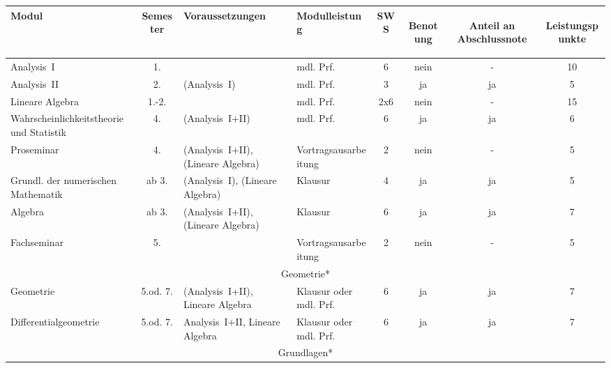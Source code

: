 \begin{table}[tbp]
    \begin{footnotesize}
    \begin{tabularx}{\textwidth}{|@{~}X@{~}|@{~}c@{~}|@{~}X@{~}|@{~}X@{~}|@{~}c@{~}|@{~}c@{~}|@{~}c@{~}|@{~}c@{~}|}
        \hline
        Modul & Semes\-ter & Voraus\-setzungen & Modul\-leistung & SWS & \begin{sideways}Be\-notung\end{sideways} & \begin{sideways}Anteil an Abschluss\-note \end{sideways}& \begin{sideways}Leistungspunkte\end{sideways}\\\hline\hline
        Analysis~I  &   1.  &                &   mdl. Prf.   &  6   &   nein    &   -   &   10\\\hline
        Analysis~II &   2.  &  (Analysis~I)   &   mdl. Prf.   &  3   &   ja      &   ja  &   5\\\hline
        Lineare Algebra &  1.-2.   &         &   mdl. Prf.   &  2x6 &   nein    &   -   &   15\\\hline
        Wahr\-schein\-lich\-keits\-theorie und Sta\-tis\-tik&4.&(Analysis~I+II)&mdl. Prf.&6&ja&ja&6\\\hline
        Pro\-seminar&4.&(Analy\-sis~I+II), (Lineare Algebra)&Vortrags\-aus\-arbeitung&2&nein&-&5\\\hline
        Grundl. der numerischen Mathe\-matik&ab 3.&(Analy\-sis~I), (Lineare Algebra)&Klausur&4&ja&ja&5\\\hline
        Algebra&ab 3.&(Analy\-sis~I+II), (Lineare Algebra)&Klausur&6&ja&ja&7\\\hline
        Fach\-seminar&5.&&Vortrags\-aus\-arbeitung&2&nein&-&5\\\hline\hline
        \multicolumn{8}{|c|}{Geometrie*}\\\hline
        Geometrie&5.od. 7.&(Analysis~I+II), Lineare Algebra&Klausur oder mdl. Prf.&6&ja&ja&7\\\hline
        Differential\-geometrie&5.od. 7.&Analysis~I+II, Lineare Algebra&Klausur oder mdl. Prf.&6&ja&ja&7\\\hline\hline
        \multicolumn{8}{|c|}{Grundlagen*}\\\hline

\end{tabularx}
\end{footnotesize}
\end{table}
